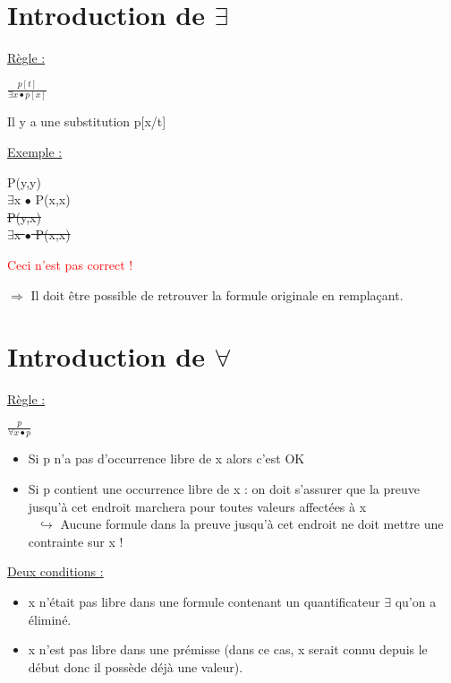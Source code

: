 \begin{flushleft}
\section{Introduction de $\exists$}
\underline{R\`egle :}\\
\begin{center}
{\LARGE $\frac{p[t]}{\exists x \bullet p[x]}$}
\end{center}
\begin{flushright}
Il y a une substitution p[x/t]
\end{flushright}

\underline{Exemple :}\\
\begin{center}
 P(y,y)\\
$\exists$x $\bullet$ P(x,x)\\[2\baselineskip]
\sout{P(y,x)}\\
\sout{$\exists$x $\bullet$ P(x,x)}
\begin{flushright}
\textcolor{red}{Ceci n'est pas correct !}
\end{flushright}
\end{center}
$\Rightarrow$ Il doit être possible de retrouver la formule originale en remplaçant.\\

\section{Introduction de $\forall$}
\underline{R\`egle :}\\
\begin{center}
{\LARGE $\frac{p}{\forall x \bullet p}$}
\end{center}
\begin{itemize}
\item Si p n'a pas d'occurrence libre de x alors c'est OK
\item Si p contient une occurrence libre de x : on doit s'assurer que la preuve jusqu'à cet endroit marchera pour toutes valeurs affectées à x\\
$\> \> \> \hookrightarrow$ Aucune formule dans la preuve jusqu'à cet endroit ne doit mettre une contrainte sur x !
\end{itemize}
\underline{Deux conditions :}\\
\begin{itemize}
\item x n'était pas libre dans une formule contenant un quantificateur $\exists$ qu'on a éliminé.
\item x n'est pas libre dans une prémisse (dans ce cas, x serait connu depuis le début donc il possède déjà une valeur).
\end{itemize}


\end{flushleft}
